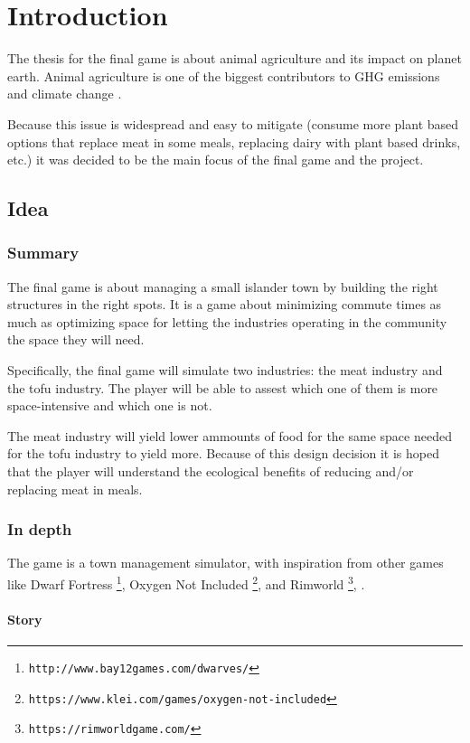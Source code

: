 \section{Introduction}

The thesis for the final game is about animal agriculture and its impact
on planet earth. Animal agriculture is one of the biggest contributors
to \gls{GHG} emissions and climate change \cite{gerber2013tackling}.

Because this issue is widespread and easy to mitigate (consume more plant
based options that replace meat in some meals, replacing dairy with
plant based drinks, etc.) it was decided to be the main focus of the final
game and the project.
\subsection{Idea}

\subsubsection{Summary}

The final game is about managing a small islander town by building
the right structures in the right spots. It is a game about minimizing
commute times as much as optimizing space for letting the industries
operating in the community the space they will need.

Specifically, the final game will simulate two industries: the meat
industry and the tofu industry. The player will be able to assest
which one of them is more space-intensive and which one is not.

The meat industry will yield lower ammounts of food for the same
space needed for the tofu industry to yield more. Because of
this design decision it is hoped that the player will understand the
ecological benefits of reducing and/or replacing meat in meals.

\subsubsection{In depth}

The game is a town management simulator, with inspiration from other
games like Dwarf Fortress 
\footnote{\texttt{http://www.bay12games.com/dwarves/}},
Oxygen Not Included
\footnote{\texttt{https://www.klei.com/games/oxygen-not-included}},
and Rimworld
\footnote{\texttt{https://rimworldgame.com/}},
.

\paragraph{Story}

